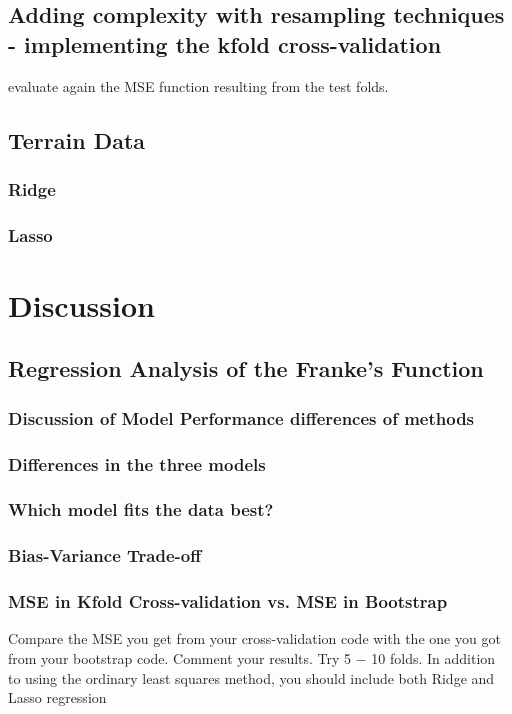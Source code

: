 \documentclass[aps,rmp,reprint,amsmath,amssymb,graphicx,longbibliography]{revtex4-1}
\begin{document}
\subsection{Adding complexity with resampling techniques - implementing the kfold cross-validation}
evaluate again the MSE function resulting from the test folds.

\subsection{Terrain Data}
\subsubsection{Ridge}
\subsubsection{Lasso}

\section{Discussion}
\subsection{Regression Analysis of the Franke's Function}
\subsubsection{Discussion of Model Performance differences of methods}
\subsubsection{Differences in the three models}
\subsubsection{Which model fits the data best?}
\subsubsection{Bias-Variance Trade-off}
\subsubsection{ MSE in Kfold Cross-validation vs. MSE in Bootstrap}
Compare the MSE you get from your cross-validation code with the one you
got from your bootstrap code. Comment your results. Try 5 − 10 folds.
In addition to using the ordinary least squares method, you should include
both Ridge and Lasso regression
\end{document}

